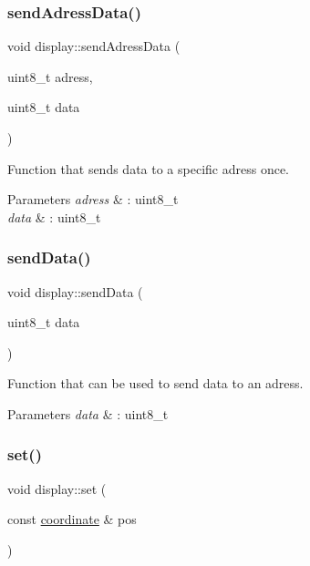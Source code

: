 \subsubsection{\texorpdfstring{send\+Adress\+Data()}{sendAdressData()}}
{\footnotesize\ttfamily void display\+::send\+Adress\+Data (\begin{DoxyParamCaption}\item[{uint8\+\_\+t}]{adress,  }\item[{uint8\+\_\+t}]{data }\end{DoxyParamCaption})}



Function that sends data to a specific adress once. 


\begin{DoxyParams}{Parameters}
{\em adress} & \+: uint8\+\_\+t \\
\hline
{\em data} & \+: uint8\+\_\+t \\
\hline
\end{DoxyParams}
\mbox{\label{classdisplay_afaec31b348110cd7f81ff690dc70b5a9}} 
\subsubsection{\texorpdfstring{send\+Data()}{sendData()}}
{\footnotesize\ttfamily void display\+::send\+Data (\begin{DoxyParamCaption}\item[{uint8\+\_\+t}]{data }\end{DoxyParamCaption})}



Function that can be used to send data to an adress. 


\begin{DoxyParams}{Parameters}
{\em data} & \+: uint8\+\_\+t \\
\hline
\end{DoxyParams}
\mbox{\label{classdisplay_a3703b7e40fdcabbd0172f83f97b3e266}} 
\subsubsection{\texorpdfstring{set()}{set()}}
{\footnotesize\ttfamily void display\+::set (\begin{DoxyParamCaption}\item[{const \hyperlink{classcoordinate}{coordinate} \&}]{pos }\end{DoxyParamCaption})}



